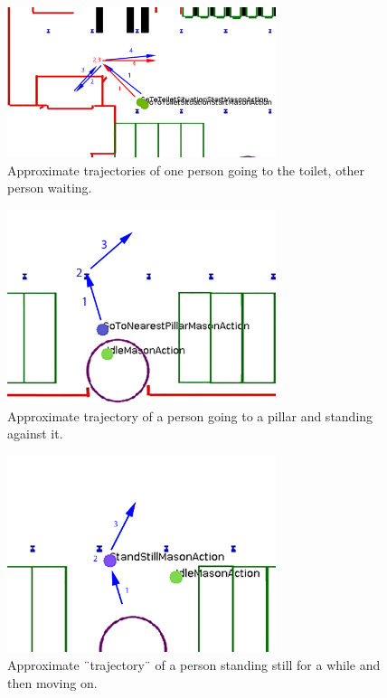 \documentclass[11pt, a4paper]{book}
\begin{document}
\begin{figure}[h!]
\centering
\includegraphics[width=0.7\textwidth]{"./qualitative experiment pictures/simulated_gototoilet_cropped"}
\caption{Approximate trajectories of one person going to the toilet, other person waiting.}
\label{fig:simulatedtoilettrajectory}
\end{figure}
\begin{figure}[h!]
\centering
\includegraphics[width=0.7\textwidth]{"./qualitative experiment pictures/simulated_pillarsituation_cropped"}
\caption{Approximate trajectory of a person going to a pillar and standing against it.}
\label{fig:simulatedpillartrajectory}
\end{figure}
\begin{figure}[h!]
\centering
\includegraphics[width=0.7\textwidth]{"./qualitative experiment pictures/simulated_standstillsituation_cropped"}
\caption{Approximate ¨trajectory¨ of a person standing still for a while and then moving on.}
\label{fig:simulatedstandstilltrajectory}
\end{figure}
\end{document}

